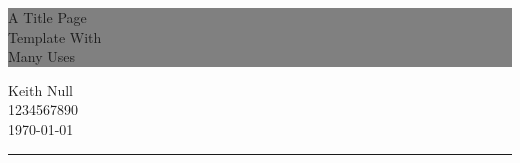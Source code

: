 \begin{titlepage} %


	\colorbox{grey}{
		\parbox[t]{0.93\textwidth}{ %
			\parbox[t]{0.91\textwidth}{ %
				\raggedleft %
				\fontsize{50pt}{80pt}\selectfont %
				\vspace{0.7cm} %

				A Title Page\\
				Template With\\
				Many Uses\\

				\vspace{0.7cm} %
			}
		}
	}

	\vfill %


	\parbox[t]{0.93\textwidth}{ %
		\raggedleft %
		\large %
		{\Large Keith Null}\\[4pt] %
		1234567890\\
		\today\\

		\hfill\rule{0.2\linewidth}{1pt}%
	}

\end{titlepage}



